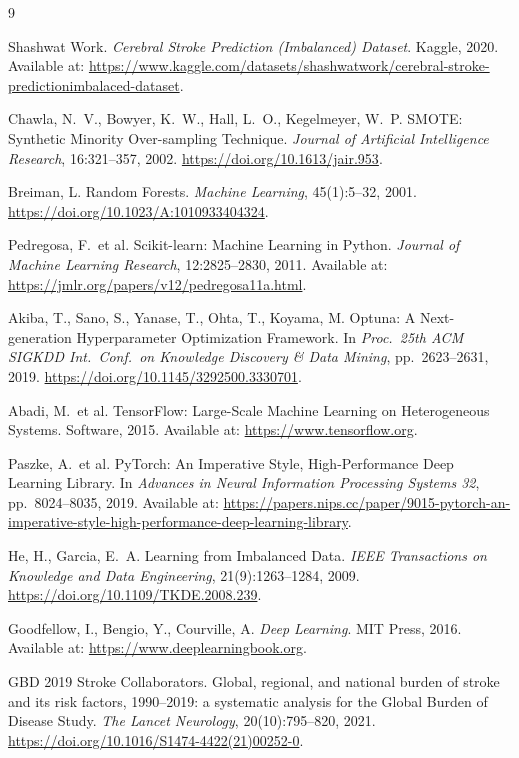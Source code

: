\documentclass[pdflatex,sn-basic,Numbered]{sn-jnl}
\theoremstyle{thmstyleone}
\theoremstyle{thmstyletwo}
\theoremstyle{thmstylethree}
\begin{document}
\begin{thebibliography}{9}

Shashwat Work.
\emph{Cerebral Stroke Prediction (Imbalanced) Dataset}.
Kaggle, 2020.
Available at: \url{https://www.kaggle.com/datasets/shashwatwork/cerebral-stroke-predictionimbalaced-dataset}.

Chawla, N.~V., Bowyer, K.~W., Hall, L.~O., Kegelmeyer, W.~P.
SMOTE: Synthetic Minority Over-sampling Technique.
\emph{Journal of Artificial Intelligence Research}, 16:321--357, 2002.
\url{https://doi.org/10.1613/jair.953}.

Breiman, L.
Random Forests.
\emph{Machine Learning}, 45(1):5--32, 2001.
\url{https://doi.org/10.1023/A:1010933404324}.

Pedregosa, F.\ et al.
Scikit-learn: Machine Learning in Python.
\emph{Journal of Machine Learning Research}, 12:2825--2830, 2011.
Available at: \url{https://jmlr.org/papers/v12/pedregosa11a.html}.

Akiba, T., Sano, S., Yanase, T., Ohta, T., Koyama, M.
Optuna: A Next-generation Hyperparameter Optimization Framework.
In \emph{Proc.\ 25th ACM SIGKDD Int.\ Conf.\ on Knowledge Discovery \&
Data Mining}, pp.\ 2623--2631, 2019.
\url{https://doi.org/10.1145/3292500.3330701}.

Abadi, M.\ et al.
TensorFlow: Large-Scale Machine Learning on Heterogeneous Systems.
Software, 2015.
Available at: \url{https://www.tensorflow.org}.

Paszke, A.\ et al.
PyTorch: An Imperative Style, High-Performance Deep Learning Library.
In \emph{Advances in Neural Information Processing Systems 32},
pp.\ 8024--8035, 2019.
Available at: \url{https://papers.nips.cc/paper/9015-pytorch-an-imperative-style-high-performance-deep-learning-library}.

He, H., Garcia, E.~A.
Learning from Imbalanced Data.
\emph{IEEE Transactions on Knowledge and Data Engineering},
21(9):1263--1284, 2009.
\url{https://doi.org/10.1109/TKDE.2008.239}.

Goodfellow, I., Bengio, Y., Courville, A.
\emph{Deep Learning}.
MIT Press, 2016.
Available at: \url{https://www.deeplearningbook.org}.

GBD 2019 Stroke Collaborators.
Global, regional, and national burden of stroke and its risk factors,
1990--2019: a systematic analysis for the Global Burden of Disease Study.
\emph{The Lancet Neurology}, 20(10):795--820, 2021.
\url{https://doi.org/10.1016/S1474-4422(21)00252-0}.


\end{thebibliography}
\end{document}
